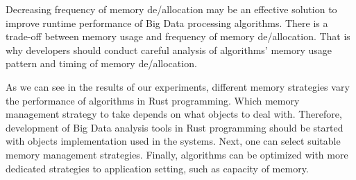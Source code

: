 Decreasing frequency of memory de/allocation may be an effective solution to improve runtime performance of Big Data processing algorithms. 
There is a trade-off between memory usage and frequency of memory de/allocation. 
That is why developers should conduct careful analysis of algorithms' memory usage pattern and timing of memory de/allocation.

As we can see in the results of our experiments, different memory strategies vary the performance of algorithms in Rust programming.
Which memory management strategy to take depends on what objects to deal with. 
Therefore, development of Big Data analysis tools in Rust programming should be started with objects implementation used in the systems.
Next, one can select suitable memory management strategies. 
Finally, algorithms can be optimized with more dedicated strategies to application setting, such as capacity of memory.